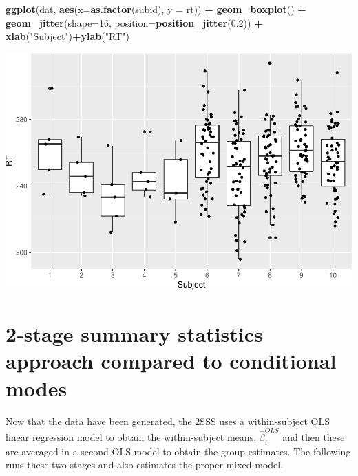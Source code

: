 \documentclass[
]{book}
\newenvironment{Shaded}{\begin{snugshade}}{\end{snugshade}}
\newcommand{\DataTypeTok}[1]{\textcolor[rgb]{0.13,0.29,0.53}{#1}}
\newcommand{\DecValTok}[1]{\textcolor[rgb]{0.00,0.00,0.81}{#1}}
\newcommand{\FloatTok}[1]{\textcolor[rgb]{0.00,0.00,0.81}{#1}}
\newcommand{\KeywordTok}[1]{\textcolor[rgb]{0.13,0.29,0.53}{\textbf{#1}}}
\newcommand{\NormalTok}[1]{#1}
\newcommand{\OperatorTok}[1]{\textcolor[rgb]{0.81,0.36,0.00}{\textbf{#1}}}
\newcommand{\StringTok}[1]{\textcolor[rgb]{0.31,0.60,0.02}{#1}}
\begin{document}
\begin{Shaded}
\begin{Highlighting}[]
\KeywordTok{ggplot}\NormalTok{(dat, }\KeywordTok{aes}\NormalTok{(}\DataTypeTok{x=}\KeywordTok{as.factor}\NormalTok{(subid), }\DataTypeTok{y =}\NormalTok{ rt)) }\OperatorTok{+}
\StringTok{  }\KeywordTok{geom\_boxplot}\NormalTok{() }\OperatorTok{+}\StringTok{ }
\StringTok{  }\KeywordTok{geom\_jitter}\NormalTok{(}\DataTypeTok{shape=}\DecValTok{16}\NormalTok{, }\DataTypeTok{position=}\KeywordTok{position\_jitter}\NormalTok{(}\FloatTok{0.2}\NormalTok{)) }\OperatorTok{+}
\StringTok{  }\KeywordTok{xlab}\NormalTok{(}\StringTok{"Subject"}\NormalTok{)}\OperatorTok{+}\KeywordTok{ylab}\NormalTok{(}\StringTok{"RT"}\NormalTok{)}
\end{Highlighting}
\end{Shaded}

\includegraphics{2_video4_two_stage_temptation_files/figure-latex/unnamed-chunk-3-1.pdf}

\hypertarget{stage-summary-statistics-approach-compared-to-conditional-modes}{%
\section{2-stage summary statistics approach compared to conditional modes}\label{stage-summary-statistics-approach-compared-to-conditional-modes}}

Now that the data have been generated, the 2SSS uses a within-subject OLS linear regression model to obtain the within-subject means, \(\hat\beta_i^{OLS}\) and then these are averaged in a second OLS model to obtain the group estimates. The following runs these two stages and also estimates the proper mixed model.
\end{document}
